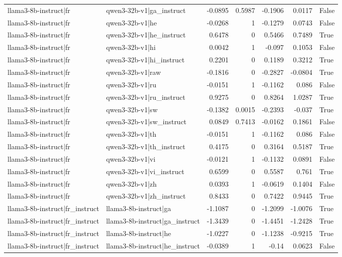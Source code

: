 \begin{table}
\begin{tabular}{l l r r r r l}
llama3-8b-instruct|fr & qwen3-32b-v1|ga_instruct & -0.0895 & 0.5987 & -0.1906 & 0.0117 & False \\
llama3-8b-instruct|fr & qwen3-32b-v1|he & -0.0268 & 1 & -0.1279 & 0.0743 & False \\
llama3-8b-instruct|fr & qwen3-32b-v1|he_instruct & 0.6478 & 0 & 0.5466 & 0.7489 & True \\
llama3-8b-instruct|fr & qwen3-32b-v1|hi & 0.0042 & 1 & -0.097 & 0.1053 & False \\
llama3-8b-instruct|fr & qwen3-32b-v1|hi_instruct & 0.2201 & 0 & 0.1189 & 0.3212 & True \\
llama3-8b-instruct|fr & qwen3-32b-v1|raw & -0.1816 & 0 & -0.2827 & -0.0804 & True \\
llama3-8b-instruct|fr & qwen3-32b-v1|ru & -0.0151 & 1 & -0.1162 & 0.086 & False \\
llama3-8b-instruct|fr & qwen3-32b-v1|ru_instruct & 0.9275 & 0 & 0.8264 & 1.0287 & True \\
llama3-8b-instruct|fr & qwen3-32b-v1|sw & -0.1382 & 0.0015 & -0.2393 & -0.037 & True \\
llama3-8b-instruct|fr & qwen3-32b-v1|sw_instruct & 0.0849 & 0.7413 & -0.0162 & 0.1861 & False \\
llama3-8b-instruct|fr & qwen3-32b-v1|th & -0.0151 & 1 & -0.1162 & 0.086 & False \\
llama3-8b-instruct|fr & qwen3-32b-v1|th_instruct & 0.4175 & 0 & 0.3164 & 0.5187 & True \\
llama3-8b-instruct|fr & qwen3-32b-v1|vi & -0.0121 & 1 & -0.1132 & 0.0891 & False \\
llama3-8b-instruct|fr & qwen3-32b-v1|vi_instruct & 0.6599 & 0 & 0.5587 & 0.761 & True \\
llama3-8b-instruct|fr & qwen3-32b-v1|zh & 0.0393 & 1 & -0.0619 & 0.1404 & False \\
llama3-8b-instruct|fr & qwen3-32b-v1|zh_instruct & 0.8433 & 0 & 0.7422 & 0.9445 & True \\
llama3-8b-instruct|fr_instruct & llama3-8b-instruct|ga & -1.1087 & 0 & -1.2099 & -1.0076 & True \\
llama3-8b-instruct|fr_instruct & llama3-8b-instruct|ga_instruct & -1.3439 & 0 & -1.4451 & -1.2428 & True \\
llama3-8b-instruct|fr_instruct & llama3-8b-instruct|he & -1.0227 & 0 & -1.1238 & -0.9215 & True \\
llama3-8b-instruct|fr_instruct & llama3-8b-instruct|he_instruct & -0.0389 & 1 & -0.14 & 0.0623 & False \\

\end{tabular}
\end{table}
